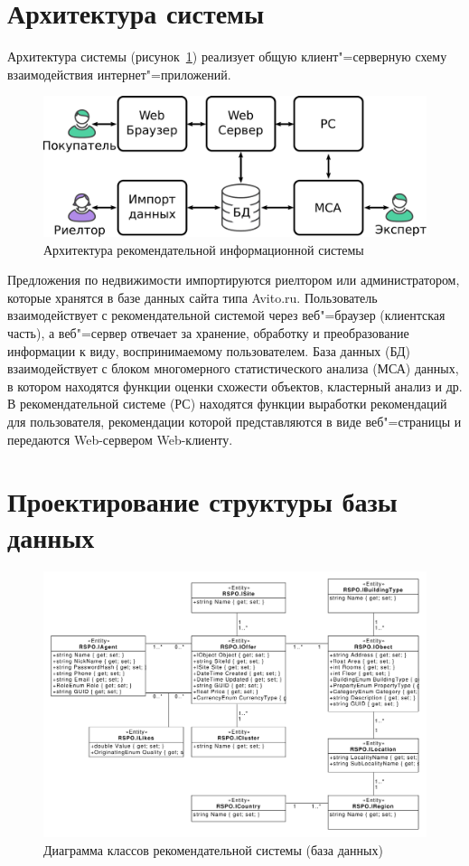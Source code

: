 \documentclass[a4paper,14pt,openany,final]{extreport} %
\def\oldcaption{} \let\oldcaption=\caption
\def\caption{\stepcounter{captionsnum}\oldcaption}
\begin{document}
\section{Архитектура системы}
Архитектура системы (рисунок~\ref{fig:architecture}) реализует общую клиент"=серверную схему взаимодействия интернет"=приложений.
\begin{figure}[htbp]
  \centering
  \includegraphics[width=0.7\linewidth]{architecture.pdf}
  \caption{Архитектура рекомендательной информационной системы}
  \label{fig:architecture}
\end{figure}

Предложения по недвижимости импортируются риелтором или администратором, которые хранятся в базе данных сайта типа Avito.ru. Пользователь взаимодействует с рекомендательной системой через веб"=браузер (клиентская часть), а веб"=сервер отвечает за хранение, обработку и преобразование информации к виду, воспринимаемому пользователем. База данных (БД) взаимодействует с блоком многомерного статистического анализа (МСА) данных, в котором находятся функции оценки схожести объектов, кластерный анализ и др. В рекомендательной системе (РС) находятся функции выработки рекомендаций для пользователя, рекомендации которой представляются в виде веб"=страницы и передаются Web-сервером Web-клиенту.

\section{Проектирование структуры базы данных}

\begin{figure}[htbp]
  \centering
  \includegraphics[width=0.9\linewidth]{class_diagram.pdf}
  \caption{Диаграмма классов рекомендательной системы (база данных)}
  \label{fig:classdiagram}
\end{figure}
\end{document}
